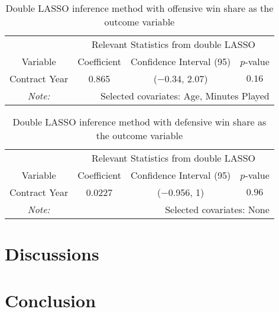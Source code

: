 \documentclass[12pt]{article}
\begin{document}
	\begin{table}[!htbp]
		\centering
		\caption{Double LASSO inference method with offensive win share as the outcome variable}
		\label{lassoows} 
		\begin{tabular}{*4c}
			\toprule
			& \multicolumn{3}{c}{Relevant Statistics from double LASSO} \\
			\cmidrule(lr){2-4}
			Variable & Coefficient  & Confidence Interval (95) & $p$-value \\
			\midrule
			Contract Year & 0.865       & ($-$0.34, 2.07) & $0.16$       \\
			\bottomrule
			\textit{Note:}  & \multicolumn{3}{r}{Selected covariates: Age, Minutes Played} \\
		\end{tabular}
	\end{table}

	\begin{table}[!htbp]
		\centering
		\caption{Double LASSO inference method with defensive win share as the outcome variable}
		\label{lassodws} 
		\begin{tabular}{*4c}
			\toprule
			& \multicolumn{3}{c}{Relevant Statistics from double LASSO} \\
			\cmidrule(lr){2-4}
			Variable & Coefficient  & Confidence Interval (95) & $p$-value \\
			\midrule
			Contract Year & 0.0227       & ($-$0.956, 1) & $0.96$       \\
			\bottomrule
			\textit{Note:}  & \multicolumn{3}{r}{Selected covariates: None} \\
		\end{tabular}
	\end{table}
	
	\section{Discussions} \label{sec:discussion}
	
	\section{Conclusion} \label{sec:conclusion}
	
	\clearpage
	
	\singlespacing
	
	
	
	
	
	\clearpage
	
\end{document}
